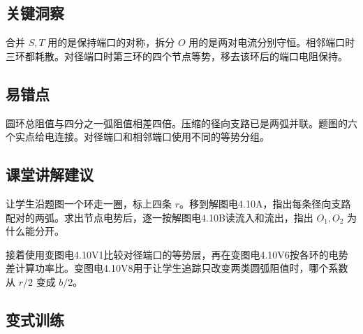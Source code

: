 \documentclass[UTF8,fontset=fandol,a4paper,11pt]{ctexart}
\begin{document}


\subsection*{关键洞察}

合并 $S,T$ 用的是保持端口的对称，拆分 $O$ 用的是两对电流分别守恒。相邻端口时三环都耗散。对径端口时第三环的四个节点等势，移去该环后的端口电阻保持。



\subsection*{易错点}

圆环总阻值与四分之一弧阻值相差四倍。压缩的径向支路已是两弧并联。题图的六个实点给电连接。对径端口和相邻端口使用不同的等势分组。



\subsection*{课堂讲解建议}

让学生沿题图一个环走一圈，标上四条 $r$。移到解图电4.10A，指出每条径向支路配对的两弧。求出节点电势后，逐一按解图电4.10B读流入和流出，指出 $O_1,O_2$ 为什么能分开。

接着使用变图电4.10V1比较对径端口的等势层，再在变图电4.10V6按各环的电势差计算功率比。变图电4.10V8用于让学生追踪只改变两类圆弧阻值时，哪个系数从 $r/2$ 变成 $b/2$。


\subsection*{变式训练}
\end{document}
